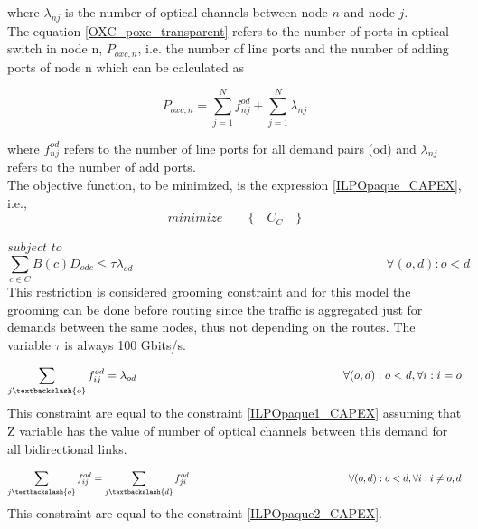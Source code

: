 \vspace{11pt}
\noindent
where $\lambda_{nj}$ is the number of optical channels between node $n$ and node $j$.\\

The equation \ref{OXC_poxc_transparent} refers to the number of ports in optical switch in node n, $P_{oxc,n}$, i.e. the number of line ports and the number of adding ports of node n which can be calculated as

\begin{equation}
P_{oxc,n} = \sum_{j=1}^{N} f_{nj}^{od} + \sum_{j=1}^{N} \lambda_{nj}
\label{OXC_poxc_transparent}
\end{equation}

\vspace{11pt}
\noindent
where $f_{nj}^{od}$ refers to the number of line ports for all demand pairs (od) and $\lambda_{nj}$ refers to the number of add ports.\\

The objective function, to be minimized, is the expression \ref{ILPOpaque_CAPEX}, i.e.,
\begin{equation*}
  minimize \qquad \Big\{ \quad C_C \quad \Big\}
\end{equation*}

$subject$ $to$
\begin{equation}
\sum_{c\in C} B\left(c\right) D_{odc} \leq \tau \lambda_{od} \qquad \qquad \qquad \qquad \qquad \qquad \qquad \qquad \qquad \qquad
\forall(o,d) : o < d
\label{ILPTransp0_surv}
\end{equation}
\noindent
This restriction is considered grooming constraint and for this model the grooming can be done before routing since the traffic is aggregated just for demands between the same nodes, thus not depending on the routes. The variable $\tau$ is always 100 Gbits/s.

\begin{equation}
\sum_{j\textbackslash \{o\}} f_{ij}^{od} = \lambda_{od}  \qquad \qquad \qquad \qquad \qquad \qquad \qquad \qquad \qquad
\forall(o,d) : o < d, \forall i: i = o
\label{ILPTransp1_surv}
\end{equation}
\noindent
This constraint are equal to the constraint \ref{ILPOpaque1_CAPEX} assuming that Z variable has the value of number of optical channels between this demand for all bidirectional links.

\begin{equation}
\sum_{j\textbackslash \{o\}} f_{ij}^{od} = \sum_{j\textbackslash \{d\}} f_{ji}^{od} \qquad \qquad \qquad \qquad \qquad \qquad \qquad \qquad
\forall(o,d) : o < d, \forall i: i \neq o,d
\label{ILPTransp2_surv}
\end{equation}
\noindent
This constraint are equal to the constraint \ref{ILPOpaque2_CAPEX}.

